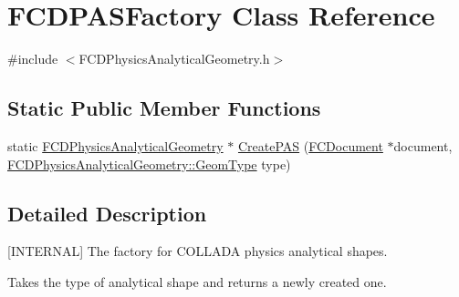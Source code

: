 \hypertarget{classFCDPASFactory}{
\section{FCDPASFactory Class Reference}
\label{classFCDPASFactory}
}


{\ttfamily \#include $<$FCDPhysicsAnalyticalGeometry.h$>$}

\subsection*{Static Public Member Functions}
\begin{DoxyCompactItemize}
\item 
static \hyperlink{classFCDPhysicsAnalyticalGeometry}{FCDPhysicsAnalyticalGeometry} $\ast$ \hyperlink{classFCDPASFactory_a3ed9d3dce52c9c82d3376a30eda9de25}{CreatePAS} (\hyperlink{classFCDocument}{FCDocument} $\ast$document, \hyperlink{classFCDPhysicsAnalyticalGeometry_a511583406e5c6a1bb5bd84c0453a452c}{FCDPhysicsAnalyticalGeometry::GeomType} type)
\end{DoxyCompactItemize}


\subsection{Detailed Description}
\mbox{[}INTERNAL\mbox{]} The factory for COLLADA physics analytical shapes.

Takes the type of analytical shape and returns a newly created one. 

